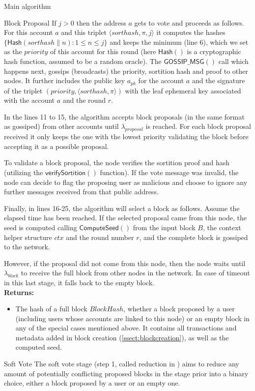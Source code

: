\documentclass[10pt,a4paper]{article}
\begin{document}
\begin{section}{Main algorithm}
\begin{subsection}{Block Proposal}
If $j>0$ then the address $a$ gets to vote and proceeds as follows.
For this account $a$ and this triplet $\langle sorthash, \pi, j\rangle$
it computes the hashes $\{ \mathsf{Hash}(sorthash \| n):1\le n\le j\}$
and keeps the minimum (line 6), which we set as the $priority$ of this
account for this round (here $\mathsf{Hash}()$ is a cryptographic hash
function, assumed to be a random oracle).
The $\mathsf{GOSSIP\_MSG}()$ call which happens next, gossips (broadcasts) 
the priority, sortition hash and proof to other nodes.
It further includes the public key $a_{pk}$ for the account $a$ and the
signature of the triplet $(priority, \langle sorthash, \pi\rangle)$ with the 
leaf ephemeral key associated with the account $a$ and the round $r$.

In the lines 11 to 15, the algorithm accepts block proposals (in the same 
format as gossiped) from other accounts until $\lambda_{proposal}$ is reached.
For each block proposal received it only keeps the one with the lowest 
priority validating the block before accepting it as a possible proposal.

To validate a block proposal, the node verifies the sortition proof and hash
(utilizing the $\mathsf{verifySortition}()$ function).
If the vote message was invalid, the node can decide to flag the proposing user
as malicious and choose to ignore any further messages received from that public address.

Finally, in lines 16-25, the algorithm will select a block as 
follows. Assume the elapsed time has been reached. 
If the selected proposal came from this node, the seed is computed 
calling $\mathsf{ComputeSeed}()$ from the input block $B$, the context helper structure 
$ctx$ and the round number $r$, and the complete block is gossiped to the network.

However, if the proposal did not come from this node, then the node 
waits until $\lambda_{block}$ to receive the full block from other nodes
in the network.
In case of timeout in this last stage, it falls back to the empty block.\\

\noindent \textbf{Returns:}
\begin{itemize}
    \item The hash of a full block $BlockHash$, whether a block proposed by a user (including users 
    whose accounts are linked to this node) or an empty block in any of the special 
    cases mentioned above. It contains all transactions and metadata added in block creation (\ref{ssect:blockcreation}), 
    as well as the computed seed.
  \end{itemize}
\end{subsection}
\begin{subsection}{Soft Vote}\label{ssect:softvote}
The soft vote stage (step 1, called reduction in \cite{DBLP:conf/sosp/GiladHMVZ17}) aims to reduce 
any amount of potentially conflicting proposed blocks in the stage prior into a binary 
choice, either a block proposed by a user or an empty one.


\end{subsection}
\end{section}
\end{document}
